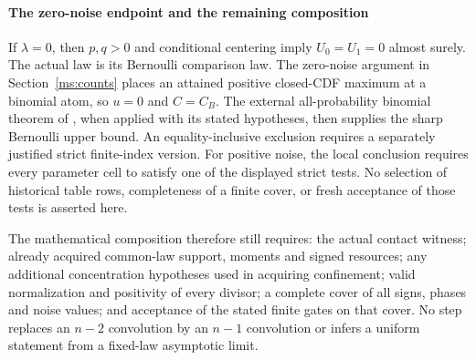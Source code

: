 \paragraph{The zero-noise endpoint and the remaining composition}
\label{ms:fourier:zero-noise}
If $\lambda=0$, then $p,q>0$ and conditional centering imply
$U_0=U_1=0$ almost surely. The actual law is its Bernoulli comparison law.
The zero-noise argument in Section~\ref{ms:counts} places an attained
positive closed-CDF maximum at a binomial atom, so $u=0$ and $C=C_B$.
The external all-probability binomial theorem of
\cite[Theorem~1]{Schulz2016}, when applied with its stated hypotheses,
then supplies the sharp Bernoulli upper bound. An equality-inclusive
exclusion requires a separately justified strict finite-index version. For positive noise, the local
conclusion requires every parameter cell to satisfy one of the displayed
strict tests. No selection of historical table rows, completeness of a
finite cover, or fresh acceptance of those tests is asserted here.

The mathematical composition therefore still requires: the actual contact
witness; already acquired common-law support, moments and signed resources;
any additional concentration hypotheses used in acquiring confinement; valid normalization and positivity
of every divisor; a complete cover of all signs, phases and noise values;
and acceptance of the stated finite gates on that cover. No step replaces
an $n-2$ convolution by an $n-1$ convolution or infers a uniform statement
from a fixed-law asymptotic limit.
